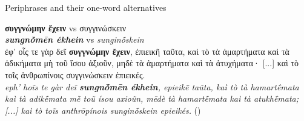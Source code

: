 \documentclass[output=paper,colorlinks,citecolor=brown]{langscibook}
\begin{document}



\ea
{Periphrases and their one-word alternatives\label{exTable3Arist}}


\ea \label{Ex6}
    \textbf{συγγνώμην ἔχειν} vs συγγινώσκειν\\
    \textit{\textbf{sungnṓmēn ékhein}} vs \textit{sunginṓskein} \\\medskip
    ἐφ' οἷς τε γὰρ δεῖ \textbf{συγγνώμην ἔχειν}, ἐπιεικῆ ταῦτα, καὶ τὸ τὰ ἁμαρτήματα καὶ τὰ ἀδικήματα μὴ τοῦ ἴσου ἀξιοῦν, μηδὲ τὰ ἁμαρτήματα καὶ τὰ ἀτυχήματα· [...] καὶ τὸ τοῖς ἀνθρωπίνοις συγγινώσκειν ἐπιεικές.\\
    \textit{eph’ hoĩs te gàr deĩ \textbf{sungnṓmēn ékhein}, epieikē̃ taũta, kaì tò tà hamartḗmata kaì tà adikḗmata mḕ toũ ísou axioũn, mēdè tà hamartḗmata kaì tà atukhḗmata; [...] kaì tò toĩs anthrōpínois sunginṓskein epieikés.} 
    \hspace*{\fill}()
\end{document}
